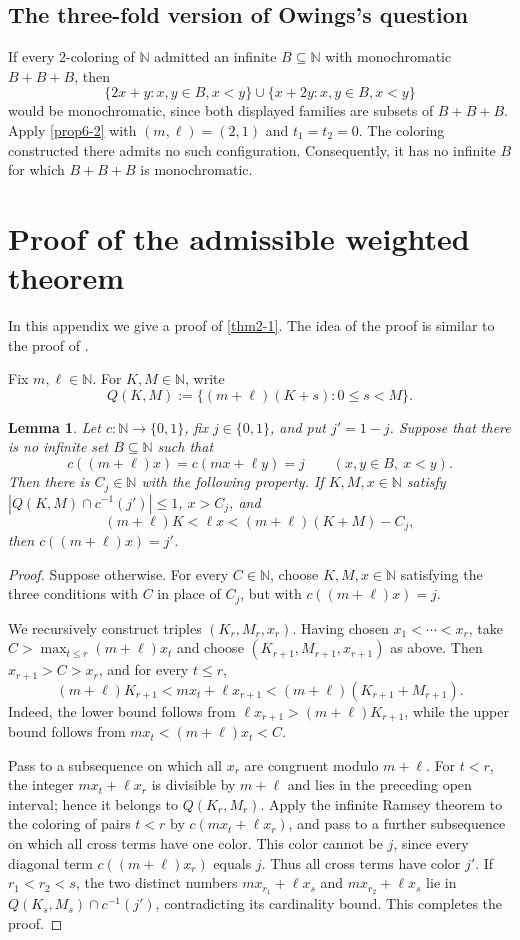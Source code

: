 \documentclass[reqno,12pt]{amsart}
\newtheorem{lemma}[thm]{Lemma}
\def \N {\mathbb N}
\numberwithin{equation}{section}
\begin{document}
\subsection{The three-fold version of Owings's question}\label{sec6-3}
If every $2$-coloring of $\N$ admitted an infinite $B\subseteq\N$ with
monochromatic $B+B+B$, then
\[
\{2x+y:x,y\in B,x<y\}\cup\{x+2y:x,y\in B,x<y\}
\]
would be monochromatic, since both displayed families are subsets of
$B+B+B$. Apply \cref{prop6-2} with $(m,\ell)=(2,1)$ and
$t_1=t_2=0$. The coloring constructed there admits no such configuration.
Consequently, it has no infinite $B$ for which $B+B+B$ is monochromatic.



\appendix

\section{Proof of the admissible weighted theorem}\label{appA}

In this appendix we give a proof of \cref{thm2-1}. The idea of the proof is similar to the proof of \cite[Corollary~2.10]{Neil79}.

Fix $m,\ell\in\N$. For $K,M\in\N$, write
\[
Q(K,M):=\{(m+\ell)(K+s):0\leq s<M\}.
\]

\begin{lemma}\label{lem:local}
Let $c:\N\to\{0,1\}$, fix $j\in\{0,1\}$, and put $j'=1-j$. Suppose that there is no infinite set $B\subseteq\N$ such that
\[
c((m+\ell)x)=c(mx+\ell y)=j\qquad(x,y\in B,\ x<y).
\]
Then there is $C_j\in\N$ with the following property. If $K,M,x\in\N$ satisfy $|Q(K,M)\cap c^{-1}(j')|\leq1$, $x>C_j$, and
\[
(m+\ell)K<\ell x<(m+\ell)(K+M)-C_j,
\]
then $c((m+\ell)x)=j'$.
\end{lemma}

\begin{proof}
Suppose otherwise. For every $C\in\N$, choose $K,M,x\in\N$ satisfying the three conditions with $C$ in place of $C_j$, but with $c((m+\ell)x)=j$.

We recursively construct triples $(K_r,M_r,x_r)$. Having chosen $x_1<\cdots<x_r$, take $C>\max_{t\leq r}(m+\ell)x_t$ and choose $(K_{r+1},M_{r+1},x_{r+1})$ as above. Then $x_{r+1}>C>x_r$, and for every $t\leq r$,
\[
(m+\ell)K_{r+1}<mx_t+\ell x_{r+1}<(m+\ell)(K_{r+1}+M_{r+1}).
\]
Indeed, the lower bound follows from $\ell x_{r+1}>(m+\ell)K_{r+1}$, while the upper bound follows from $mx_t<(m+\ell)x_t<C$.

Pass to a subsequence on which all $x_r$ are congruent modulo $m+\ell$. For $t<r$, the integer $mx_t+\ell x_r$ is divisible by $m+\ell$ and lies in the preceding open interval; hence it belongs to $Q(K_r,M_r)$. Apply the infinite Ramsey theorem \cite[Chapter~1, Theorem~5]{GrahamRothchildSpencer90} to the coloring of pairs $t<r$ by $c(mx_t+\ell x_r)$, and pass to a further subsequence on which all cross terms have one color. This color cannot be $j$, since every diagonal term $c((m+\ell)x_r)$ equals $j$. Thus all cross terms have color $j'$. If $r_1<r_2<s$, the two distinct numbers $mx_{r_1}+\ell x_s$ and $mx_{r_2}+\ell x_s$ lie in $Q(K_s,M_s)\cap c^{-1}(j')$, contradicting its cardinality bound. This completes the proof.
\end{proof}
\end{document}
